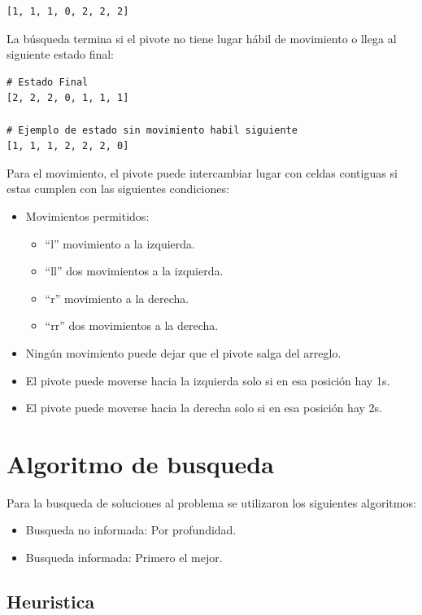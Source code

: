 \documentclass[letterpaper]{article}
\begin{document}
\begin{lstlisting}
[1, 1, 1, 0, 2, 2, 2]
\end{lstlisting}

La búsqueda termina si el pivote no tiene lugar hábil de movimiento o llega al siguiente
estado final:

\begin{lstlisting}
# Estado Final
[2, 2, 2, 0, 1, 1, 1]

# Ejemplo de estado sin movimiento habil siguiente
[1, 1, 1, 2, 2, 2, 0]
\end{lstlisting}

Para el movimiento, el pivote puede intercambiar lugar con celdas contiguas si estas
cumplen con las siguientes condiciones:

\begin{itemize}
    \item Movimientos permitidos:
        \begin{itemize}
            \item ``l'' movimiento a la izquierda.
            \item ``ll'' dos movimientos a la izquierda.
            \item ``r'' movimiento a la derecha.
            \item ``rr'' dos movimientos a la derecha.
        \end{itemize}
    \item Ningún movimiento puede dejar que el pivote salga del arreglo.
    \item El pivote puede moverse hacia la izquierda solo si en esa posición hay 1s.
    \item El pivote puede moverse hacia la derecha solo si en esa posición hay 2s.
\end{itemize}

\section{Algoritmo de busqueda}

Para la busqueda de soluciones al problema se utilizaron los siguientes algoritmos:

\begin{itemize}
  \item Busqueda no informada: Por profundidad.
  \item Busqueda informada: Primero el mejor.
\end{itemize}

\subsection{Heuristica}
\end{document}
